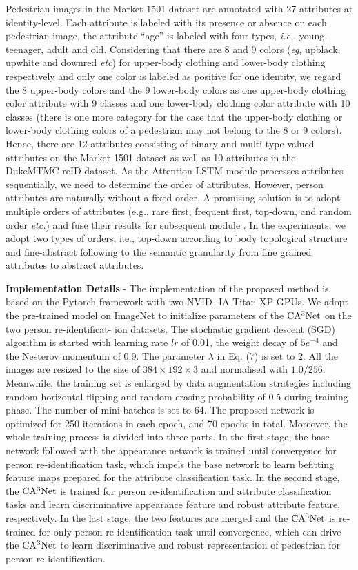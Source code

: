 \documentclass[sigconf]{acmart}
\begin{document}
Pedestrian images in the Market-1501 dataset are annotated with 27 attributes at identity-level. Each attribute is labeled with its presence or absence on each pedestrian image, the attribute ``age'' is labeled with four types, \textit{i.e.}, young, teenager, adult and old. Considering that there are 8 and 9 colors (\textit{eg},  upblack, upwhite and downred \textit{etc}) for upper-body clothing and lower-body clothing respectively and only one color is labeled as positive for one identity, we regard the 8 upper-body colors and the 9 lower-body colors as one upper-body clothing color attribute with 9 classes and one lower-body clothing color attribute with 10 classes (there is one more category for the case that the upper-body clothing or lower-body clothing colors of a pedestrian may not belong to the 8 or 9 colors). Hence, there are 12 attributes consisting of binary and multi-type valued attributes on the Market-1501 dataset as well as 10 attributes in the DukeMTMC-reID dataset. As the Attention-LSTM module processes attributes sequentially, we need to determine the order of attributes. However, person attributes are naturally without a fixed order. A promising solution is to adopt multiple orders of attributes (e.g., rare first, frequent first, top-down, and random order \textit{etc.}) and fuse their results for subsequent module \cite{56}. In the experiments, we adopt two types of orders, i.e., top-down according to body topological structure and fine-abstract following to the semantic granularity from fine grained attributes to abstract attributes.

\textbf{Implementation Details} - The implementation of the proposed method is based on the Pytorch framework with two NVID-
IA Titan XP GPUs. We adopt the pre-trained model on ImageNet to initialize parameters of the $\rm CA^3Net$ on the two person re-identificat-
ion datasets. The stochastic gradient descent (SGD) algorithm is started with learning rate $lr$ of 0.01, the weight decay of $5e^{-4}$ and the Nesterov momentum of 0.9. The parameter $\lambda$ in Eq. (7) is set to 2. All the images are resized to the size of $384\times192\times3$ and normalised with $1.0/256$. Meanwhile, the training set is enlarged by data augmentation strategies \cite{20} including random horizontal flipping and random erasing probability of 0.5 during training phase. The number of mini-batches is set to 64. The proposed network is optimized for 250 iterations in each epoch, and 70 epochs in total. Moreover, the whole training process is divided into three parts. In the first stage, the base network followed with the appearance network is trained until convergence for person re-identification task, which impels the base network to learn befitting feature maps prepared for the attribute classification task. In the second stage, the $\rm CA^3Net$ is trained for person re-identification and attribute classification tasks and learn discriminative appearance feature and robust attribute feature, respectively. In the last stage, the two features are merged and the $\rm CA^3Net$ is re-trained for only person re-identification task until convergence, which can drive the $\rm CA^3Net$ to learn discriminative and robust representation of pedestrian for person re-identification.
\end{document}
